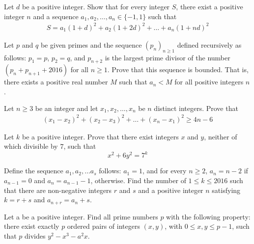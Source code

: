\documentclass[problems.tex]{subfile}
\begin{document}
	\begin{problem}
		Let $d$ be a positive integer. Show that for every integer $S$, there exist a positive integer $n$ and a sequence $a_1, a_2,\dots , a_n \in \{-1, 1\}$ such that
		\begin{align*}
			S = a_1(1 + d)^2 + a_2(1 + 2d)^2 + \dots + a_n(1 + nd)^2
		\end{align*}
	\end{problem}


	\begin{problem}
		Let $p$ and $q$ be given primes and the sequence $(p_n)_{n\geq 1}$ defined recursively as follows: $p_1 = p$, $p_2 = q$, and $p_{n+2}$ is the largest prime divisor of the number $(p_n + p_{n+1} + 2016)$ for all $n \geq 1$. Prove that this sequence is bounded. That is, there exists a positive real number $M$ such that $a_n < M$ for all positive integers $n$.
	\end{problem}



	\begin{problem}
		Let $n \geq 3$ be an integer and let $x_1, x_2,\dots , x_n$ be $n$ distinct integers. Prove that
		\begin{align*}
			(x_1 - x_2)^2 +(x_2 - x_3)^2 + \dots+(x_n - x_1)^2 \geq 4n - 6
		\end{align*}
	\end{problem}


	\begin{problem}
		Let $k$ be a positive integer. Prove that there exist integers $x$ and $y$, neither of which divisible by $7$, such that $$x^2 + 6y^2 = 7^k$$
	\end{problem}



	\begin{problem}
		Define the sequence $a_1, a_2,\dots a_s$ follows: $a_1 = 1$, and for every $n \geq 2$, $a_n = n - 2$ if $a_{n-1} = 0$ and $a_n = a_{n-1} - 1$, otherwise. Find the number of $1 \leq k \leq 2016$ such that there are non-negative integers $r$ and $s$ and a positive integer $n$ satisfying $k = r + s$ and $a_{n+r} = a_n + s.$
	\end{problem}


	\begin{problem}
		Let a be a positive integer. Find all prime numbers $p$ with the following property: there exist exactly $p$ ordered pairs of integers $(x, y)$, with $0 \leq x, y \leq p - 1$, such that $p$ divides $y^2 - x^3 - a^2x$.
	\end{problem}
\end{document}
